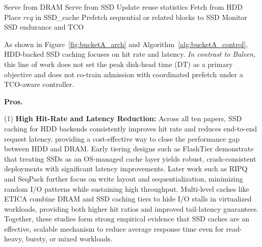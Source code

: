 
\begin{algorithm}[!htb]
\caption{Admission and Prefetch Control for HDD-backed SSD Caching}
\begin{algorithmic}[1]
        \State Serve from DRAM
        \State Serve from SSD
        \State Update reuse statistics
    \Else
        \State Fetch from HDD
         
            \State Place $req$ in SSD\_cache
        \EndIf
    \EndIf
     
        \State Prefetch sequential or related blocks to SSD
    \EndIf
    \State Monitor SSD endurance and TCO
\EndFor
\end{algorithmic}
\label{alg:bucketA_control}
\end{algorithm}


As shown in Figure~\ref{fig:bucketA_arch} and Algorithm~\ref{alg:bucketA_control}, HDD-backed SSD caching focuses on hit rate and latency. \textit{In contrast to Baleen,} this line of work does not set the peak disk-head time (DT) as a primary objective and does not co-train admission with coordinated prefetch under a TCO-aware controller.


\noindent\textbf{Pros.}


(1) \textbf{High Hit-Rate and Latency Reduction:} Across all ten papers, SSD caching for HDD backends consistently improves hit rate and reduces end-to-end request latency, providing a cost-effective way to close the performance gap between HDD and DRAM. Early tiering designs such as FlashTier \cite{saxena2012flashtier} demonstrate that treating SSDs as an OS-managed cache layer yields robust, crash-consistent deployments with significant latency improvements. Later work such as RIPQ \cite{tang2015ripq} and SeqPack \cite{tang2023seqpack} further focus on write layout and sequentialization, minimizing random I/O patterns while sustaining high throughput. Multi-level caches like ETICA \cite{ahmadian2021etica} combine DRAM and SSD caching tiers to hide I/O stalls in virtualized workloads, providing both higher hit ratios and improved tail-latency guarantees. Together, these studies form strong empirical evidence that SSD caches are an effective, scalable mechanism to reduce average response time even for read-heavy, bursty, or mixed workloads.

